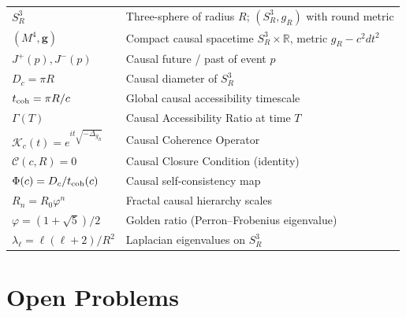 \documentclass[12pt,a4paper]{article}
\theoremstyle{plain}
\theoremstyle{definition}
\theoremstyle{remark}
\newcommand{\vph}{\varphi}
\begin{document}
\begin{tabularx}{\textwidth}{lX}
\toprule
$S^3_R$ & Three-sphere of radius $R$; $(S^3_R, g_R)$ with round metric\\
$(M^4,\mathbf{g})$ & Compact causal spacetime $S^3_R\times\mathbb{R}$, metric $g_R-c^2dt^2$\\
$J^+(p), J^-(p)$ & Causal future / past of event $p$\\
$D_c = \pi R$ & Causal diameter of $S^3_R$\\
$t_{\rm coh} = \pi R/c$ & Global causal accessibility timescale\\
$\Gamma(T)$ & Causal Accessibility Ratio at time $T$\\
$\mathcal{K}_c(t) = e^{it\sqrt{-\Delta_{g_R}}}$ & Causal Coherence Operator\\
$\mathcal{C}(c,R) = 0$ & Causal Closure Condition (identity)\\
$\Phi(c) = D_c/t_{\rm coh}(c)$ & Causal self-consistency map\\
$R_n = R_0\vph^n$ & Fractal causal hierarchy scales\\
$\vph = (1+\sqrt{5})/2$ & Golden ratio (Perron--Frobenius eigenvalue)\\
$\lambda_\ell = \ell(\ell+2)/R^2$ & Laplacian eigenvalues on $S^3_R$\\
\bottomrule
\end{tabularx}

\section{Open Problems}
\label{app:open}
\end{document}
